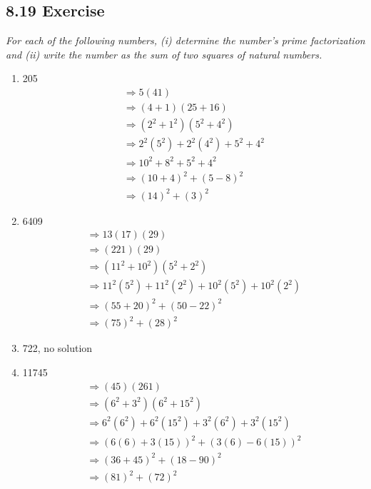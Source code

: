 \documentclass{article}
\begin{document}
\subsection*{8.19 Exercise} 
\quad \textit{For each of the following numbers, (i) determine the number's prime factorization and (ii) write the number as the sum of two squares of natural numbers.}
\begin{enumerate}
    \item 205
    \begin{align*}
        &\Longrightarrow 5 (41)&\\
        &\Longrightarrow (4 + 1) (25 + 16)&\\
        &\Longrightarrow (2^2 + 1^2) (5^2 + 4^2)&\\
        &\Longrightarrow 2^2(5^2) + 2^2(4^2) + 5^2 + 4^2\\
        &\Longrightarrow 10^2 + 8^2 + 5^2 + 4^2\\
        &\Longrightarrow (10 + 4)^2 + (5 - 8)^2\\
        &\Longrightarrow (14)^2 + (3)^2
    \end{align*}
    \item 6409
    \begin{align*}
        &\Longrightarrow 13(17)(29)&\\
        &\Longrightarrow (221)(29)&\\
        &\Longrightarrow (11^2 + 10^2) (5^2 + 2^2)&\\
        &\Longrightarrow 11^2(5^2) + 11^2(2^2) + 10^2(5^2) + 10^2(2^2)\\
        &\Longrightarrow (55 + 20)^2 + (50 - 22)^2\\
        &\Longrightarrow (75)^2 + (28)^2
    \end{align*}
    \item 722, no solution
    \item 11745
    \begin{align*}
        &\Longrightarrow (45)(261)&\\
        &\Longrightarrow (6^2 + 3^2) (6^2 + 15^2)&\\
        &\Longrightarrow 6^2(6^2) + 6^2(15^2) + 3^2(6^2) + 3^2(15^2)\\
        &\Longrightarrow (6(6) + 3(15))^2 + (3(6) - 6(15))^2\\
        &\Longrightarrow (36 + 45)^2 + (18 - 90)^2\\
        &\Longrightarrow (81)^2 + (72)^2
    \end{align*}
\end{enumerate}
\end{document}
